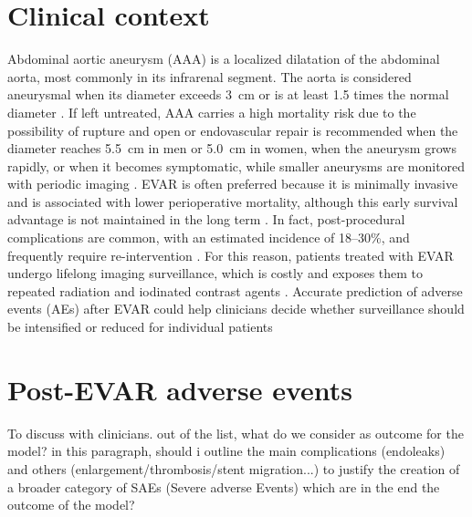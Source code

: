 \section{Clinical context}
Abdominal aortic aneurysm (AAA) is a localized dilatation of the abdominal aorta, most commonly in its infrarenal segment. The aorta is considered aneurysmal when its diameter exceeds 3~cm or is at least 1.5 times the normal diameter \cite{sakalihasan_abdominal_2018, katsoudas_hemodynamic_2026}. If left untreated, AAA carries a high mortality risk due to the possibility of rupture and open or endovascular repair is recommended when the diameter reaches 5.5~cm in men or 5.0~cm in women, when the aneurysm grows rapidly, or when it becomes symptomatic, while smaller aneurysms are monitored with periodic imaging \cite{wanhainen_editors_2024}. EVAR is often preferred because it is minimally invasive and is associated with lower perioperative mortality, although this early survival advantage is not maintained in the long term \cite{braak_scoping_2026, wanhainen_editors_2024}. In fact, post-procedural complications are common, with an estimated incidence of 18--30\%, and frequently require re-intervention \cite{daye_complications_2018}. 
For this reason, patients treated with EVAR undergo lifelong imaging surveillance, which is costly and exposes them to repeated radiation and iodinated contrast agents \cite{wanhainen_editors_2024}. Accurate prediction of adverse events (AEs) after EVAR could help clinicians decide whether surveillance should be intensified or reduced for individual patients \cite{peng_endoleak_2026, miura_initial_2024}

\section{Post-EVAR adverse events}
To discuss with clinicians. out of the list, what do we consider as outcome for the model?
in this paragraph, should i outline the main complications (endoleaks) and others (enlargement/thrombosis/stent migration...) to justify the creation of a broader category of SAEs (Severe adverse Events) which are in the end the outcome of the model?


